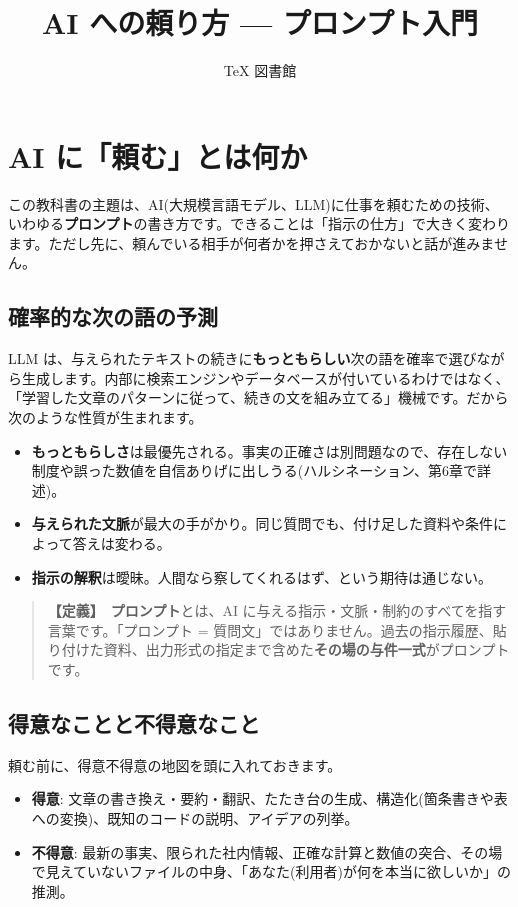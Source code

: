 \documentclass{article}
\title{AI への頼り方 — プロンプト入門}
\author{TeX 図書館}
\begin{document}
\section{AI に「頼む」とは何か}

この教科書の主題は、AI(大規模言語モデル、LLM)に仕事を頼むための技術、いわゆる\textbf{プロンプト}の書き方です。できることは「指示の仕方」で大きく変わります。ただし先に、頼んでいる相手が何者かを押さえておかないと話が進みません。

\subsection{確率的な次の語の予測}

LLM は、与えられたテキストの続きに\textbf{もっともらしい}次の語を確率で選びながら生成します。内部に検索エンジンやデータベースが付いているわけではなく、「学習した文章のパターンに従って、続きの文を組み立てる」機械です。だから次のような性質が生まれます。

\begin{itemize}
\item \textbf{もっともらしさ}は最優先される。事実の正確さは別問題なので、存在しない制度や誤った数値を自信ありげに出しうる(ハルシネーション、第6章で詳述)。
\item \textbf{与えられた文脈}が最大の手がかり。同じ質問でも、付け足した資料や条件によって答えは変わる。
\item \textbf{指示の解釈}は曖昧。人間なら察してくれるはず、という期待は通じない。
\end{itemize}

\begin{quote}
\textbf{【定義】}\ \textbf{プロンプト}とは、AI に与える指示・文脈・制約のすべてを指す言葉です。「プロンプト = 質問文」ではありません。過去の指示履歴、貼り付けた資料、出力形式の指定まで含めた\textbf{その場の与件一式}がプロンプトです。
\end{quote}

\subsection{得意なことと不得意なこと}

頼む前に、得意不得意の地図を頭に入れておきます。

\begin{itemize}
\item \textbf{得意}: 文章の書き換え・要約・翻訳、たたき台の生成、構造化(箇条書きや表への変換)、既知のコードの説明、アイデアの列挙。
\item \textbf{不得意}: 最新の事実、限られた社内情報、正確な計算と数値の突合、その場で見えていないファイルの中身、「あなた(利用者)が何を本当に欲しいか」の推測。
\end{itemize}
\end{document}
